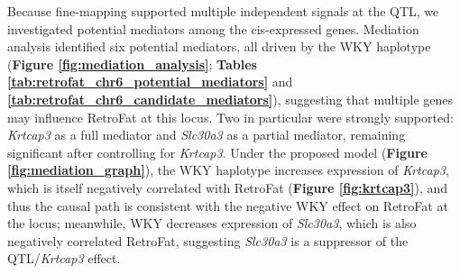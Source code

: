 Because fine-mapping supported multiple independent signals at the QTL, we investigated potential mediators among the cis-expressed genes. Mediation analysis identified six potential mediators, all driven by the WKY haplotype (\textbf{Figure \ref{fig:mediation_analysis}}; \textbf{Tables \ref{tab:retrofat_chr6_potential_mediators}} and \textbf{\ref{tab:retrofat_chr6_candidate_mediators}}), suggesting that multiple genes may influence RetroFat at this locus. Two in particular were strongly supported:  \textit{Krtcap3} as a full mediator and \textit{Slc30a3} as a partial mediator, remaining significant after controlling for \textit{Krtcap3}. Under the proposed model (\textbf{Figure \ref{fig:mediation_graph}}), the WKY haplotype increases expression of \textit{Krtcap3}, which is itself negatively correlated with RetroFat (\textbf{Figure \ref{fig:krtcap3}}), and thus the causal path is consistent with the negative WKY effect on RetroFat at the locus; meanwhile, WKY decreases expression of \textit{Slc30a3}, which is also negatively correlated RetroFat, suggesting \textit{Slc30a3} is a suppressor of the QTL/\textit{Krtcap3} effect.

